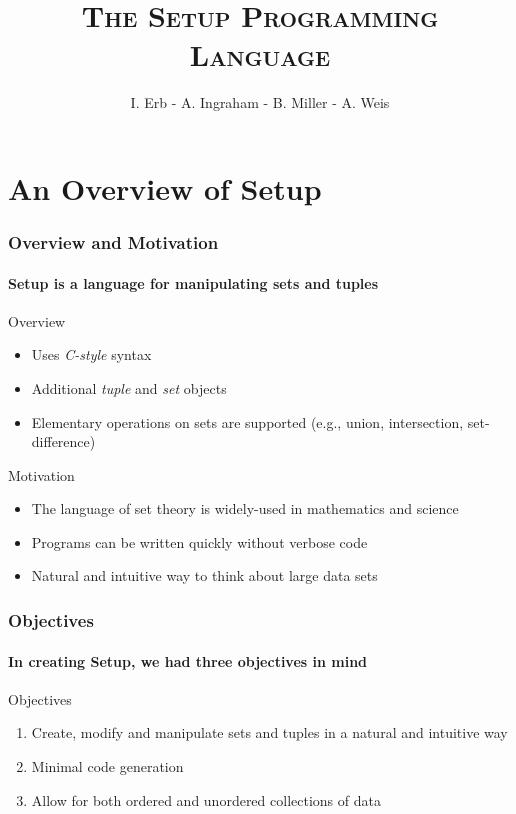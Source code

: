\documentclass{beamer}
\title{\textsc{The Setup Programming Language}}
\author{I. Erb - A. Ingraham - B. Miller - A. Weis}
\begin{document}
\frame{\titlepage}

\section*{An Overview of Setup}
\begin{frame}
	\frametitle{Overview and Motivation}
	\framesubtitle{Setup is a language for manipulating sets and tuples}
	\begin{block}{Overview}
	\begin{itemize}
	\item Uses \emph{C-style} syntax
	\item Additional \textit{tuple} and \textit{set} objects
	\item Elementary operations on sets are supported (e.g., union, intersection, set-difference)
	\end{itemize}
	\end{block}

	\begin{block}{Motivation}
	\begin{itemize}
	\item The language of set theory is widely-used in mathematics and science
	\item Programs can be written quickly without verbose code
	\item Natural and intuitive way to think about large data sets
	\end{itemize}
	\end{block}	
\end{frame}

\begin{frame}
	\frametitle{Objectives}
	\framesubtitle{In creating Setup, we had three objectives in mind}
	\begin{block}{Objectives}	
	\begin{enumerate}
		\item Create, modify and manipulate sets and tuples in a natural and intuitive way
		\item Minimal code generation
		\item Allow for both ordered and unordered collections of data
	\end{enumerate}
	\end{block}
\end{frame}
\end{document}
